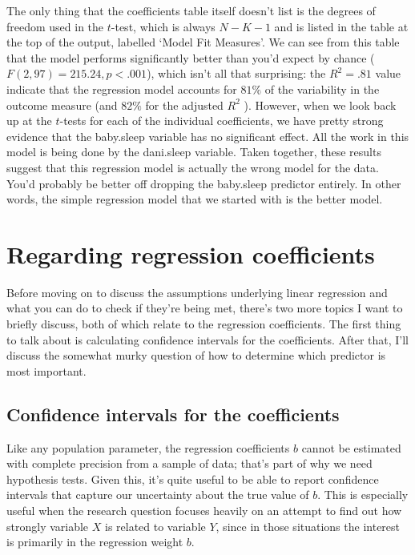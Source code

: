 \documentclass[
  a4paper,
]{book}
\begin{document}
The only thing that the coefficients table itself doesn't list is the
degrees of freedom used in the \(t\)-test, which is always \(N - K - 1\)
and is listed in the table at the top of the output, labelled `Model Fit
Measures'. We can see from this table that the model performs
significantly better than you'd expect by chance
(\(F(2,97) = 215.24, p< .001\)), which isn't all that surprising: the
\(R^2 = .81\) value indicate that the regression model accounts for
\(81\%\) of the variability in the outcome measure (and \(82\%\) for the
adjusted \(R^2\) ). However, when we look back up at the \(t\)-tests for
each of the individual coefficients, we have pretty strong evidence that
the baby.sleep variable has no significant effect. All the work in this
model is being done by the dani.sleep variable. Taken together, these
results suggest that this regression model is actually the wrong model
for the data. You'd probably be better off dropping the baby.sleep
predictor entirely. In other words, the simple regression model that we
started with is the better model.

\hypertarget{regarding-regression-coefficients}{%
\section{Regarding regression
coefficients}\label{regarding-regression-coefficients}}

Before moving on to discuss the assumptions underlying linear regression
and what you can do to check if they're being met, there's two more
topics I want to briefly discuss, both of which relate to the regression
coefficients. The first thing to talk about is calculating confidence
intervals for the coefficients. After that, I'll discuss the somewhat
murky question of how to determine which predictor is most important.

\hypertarget{confidence-intervals-for-the-coefficients}{%
\subsection{Confidence intervals for the
coefficients}\label{confidence-intervals-for-the-coefficients}}

Like any population parameter, the regression coefficients \(b\) cannot
be estimated with complete precision from a sample of data; that's part
of why we need hypothesis tests. Given this, it's quite useful to be
able to report confidence intervals that capture our uncertainty about
the true value of \(b\). This is especially useful when the research
question focuses heavily on an attempt to find out how strongly variable
\(X\) is related to variable \(Y\), since in those situations the
interest is primarily in the regression weight \(b\).
\end{document}
